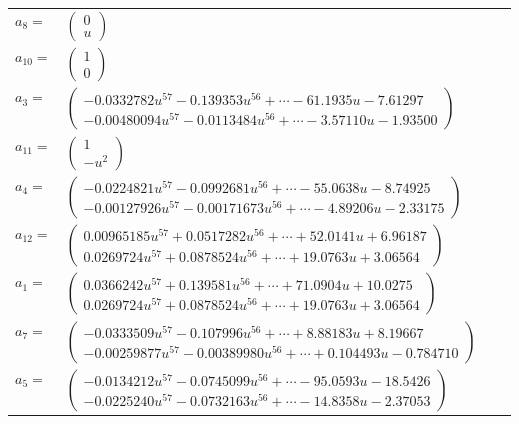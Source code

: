 \documentclass[1p]{elsarticle_modified}
\theoremstyle{definition}
\begin{document}
\begin{tabular}{m{7pt} m{180pt} m{7pt} m{180pt} }
\flushright $a_{8}=$&$\begin{pmatrix}0\\u\end{pmatrix}$ \\
\flushright $a_{10}=$&$\begin{pmatrix}1\\0\end{pmatrix}$ \\
\flushright $a_{3}=$&$\begin{pmatrix}-0.0332782 u^{57}-0.139353 u^{56}+\cdots-61.1935 u-7.61297\\-0.00480094 u^{57}-0.0113484 u^{56}+\cdots-3.57110 u-1.93500\end{pmatrix}$ \\
\flushright $a_{11}=$&$\begin{pmatrix}1\\- u^2\end{pmatrix}$ \\
\flushright $a_{4}=$&$\begin{pmatrix}-0.0224821 u^{57}-0.0992681 u^{56}+\cdots-55.0638 u-8.74925\\-0.00127926 u^{57}-0.00171673 u^{56}+\cdots-4.89206 u-2.33175\end{pmatrix}$ \\
\flushright $a_{12}=$&$\begin{pmatrix}0.00965185 u^{57}+0.0517282 u^{56}+\cdots+52.0141 u+6.96187\\0.0269724 u^{57}+0.0878524 u^{56}+\cdots+19.0763 u+3.06564\end{pmatrix}$ \\
\flushright $a_{1}=$&$\begin{pmatrix}0.0366242 u^{57}+0.139581 u^{56}+\cdots+71.0904 u+10.0275\\0.0269724 u^{57}+0.0878524 u^{56}+\cdots+19.0763 u+3.06564\end{pmatrix}$ \\
\flushright $a_{7}=$&$\begin{pmatrix}-0.0333509 u^{57}-0.107996 u^{56}+\cdots+8.88183 u+8.19667\\-0.00259877 u^{57}-0.00389980 u^{56}+\cdots+0.104493 u-0.784710\end{pmatrix}$ \\
\flushright $a_{5}=$&$\begin{pmatrix}-0.0134212 u^{57}-0.0745099 u^{56}+\cdots-95.0593 u-18.5426\\-0.0225240 u^{57}-0.0732163 u^{56}+\cdots-14.8358 u-2.37053\end{pmatrix}$ \\

\end{tabular}
\end{document}
